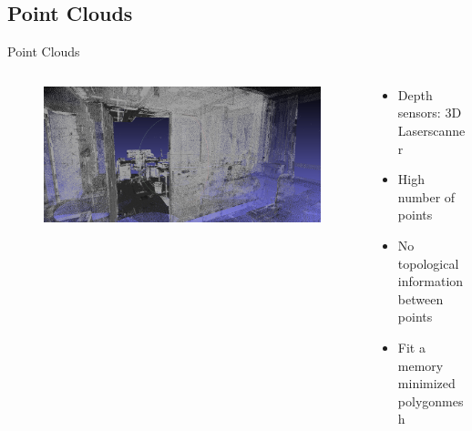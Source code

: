 \documentclass{beamer}
\begin{document}
\subsection*{Point Clouds}
\begin{frame}{Point Clouds}
 
    
  \begin{columns}
  
   \begin{column}{0.55\textwidth}
   
    \begin{figure}
      \centering
      
      \includegraphics[width=1.0\linewidth]{Images/police_points.png}
   
    \end{figure}
    
    
   \end{column}
  \begin{column}{0.45\textwidth}
  
   \begin{itemize}
    \item Depth sensors: 3D Laserscanner
    \item High number of points 
    \item No topological information between points
    \item Fit a memory minimized polygonmesh
    
   \end{itemize}
  \end{column}

   
  \end{columns}
 
\end{frame}
\end{document}
